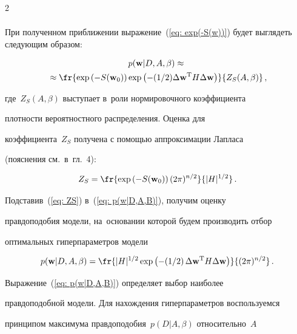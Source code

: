 \begin{multicols}{2}
\begin{multline}
\end{multline}

При полученном приближении выражение~(\ref{eq: exp(-S(w))}) будет выглядеть следующим образом:

\begin{multline}

\label {eq: p(w|D,A,B)}

p(\mathbf{w}|D,A,\beta) \approx{}\\

{}\approx \fr{\exp\left(-S(\mathbf{w}_0)\right)

\exp\left(-({1}/{2})\Delta\mathbf{w}^{\mathrm{T}}H\Delta\mathbf{w}\right)}{Z_{S}(A,\beta)}\,,

\end{multline}

где~$Z_S(A,\beta)$ выступает в~роли нормировочного коэффициента

плотности вероятностного распределения. Оценка для

коэффициента~$Z_S$ получена с помощью аппроксимации Лапласа

(пояснения см.\ в~гл.~4):

\begin{equation}

\label {eq: ZS}

Z_S=\fr{\exp\left(-S(\mathbf{w}_0)\right)(2\pi)^{{n}/{2}}}{|H|^{{1}/{2}}}\,.

\end{equation}

Подставив~(\ref{eq: ZS}) в~(\ref{eq: p(w|D,A,B)}), получим оценку

правдоподобия модели, на~основании которой будем производить отбор

оптимальных гиперпараметров модели

\begin{equation*}


p(\mathbf{w}|D,A,\beta)=\fr{|H|^{{1}/{2}}\exp\left(-({1}/{2})\,\Delta\mathbf{w}^{\mathrm{T}} H 

\Delta \mathbf{w}\right)}{(2\pi)^{{n}/{2}}}\,.

\end{equation*}

Выражение~(\ref{eq: p(w|D,A,B)}) определяет выбор наиболее

правдоподобной модели. Для нахождения ги\-пер\-па\-ра\-мет\-ров воспользуемся

принципом максимума правдоподобия~$p(D|A,\beta)$ относительно~$A$ 


\end{multicols}
